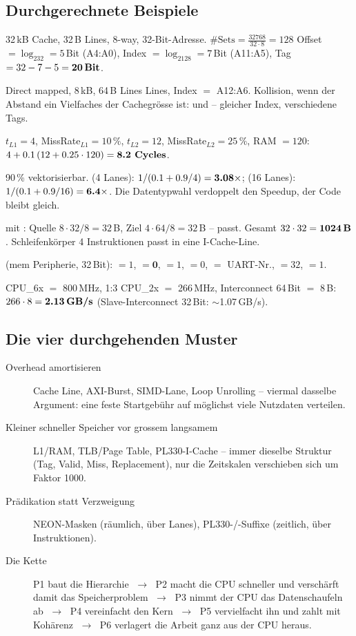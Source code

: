 \subsection{Durchgerechnete Beispiele}
\begin{bsp}
 32\,kB Cache, 32\,B Lines, 8-way, 32-Bit-Adresse.
$\#\text{Sets}=\frac{32768}{32\cdot8}=128$ \ra Offset $=\log_232=5$\,Bit
(A4:A0), Index $=\log_2128=7$\,Bit (A11:A5), Tag $=32-7-5=\textbf{20\,Bit}$.

 Direct mapped, 8\,kB, 64\,B Lines
 Lines, Index $=$ A12:A6. Kollision, wenn der Abstand ein
Vielfaches der Cachegrösse ist:  und  -- gleicher
Index, verschiedene Tags.

 $t_{L1}=4$, MissRate$_{L1}=10\,\%$, $t_{L2}=12$,
MissRate$_{L2}=25\,\%$, RAM $=120$:
$4+0.1\,(12+0.25\cdot120)=\textbf{8.2 Cycles}$.

 90\,\% vektorisierbar.
 (4 Lanes): $1/(0.1+0.9/4)=\textbf{3.08}\times$;
 (16 Lanes): $1/(0.1+0.9/16)=\textbf{6.4}\times$.
\ra Die Datentypwahl verdoppelt den Speedup, der Code bleibt gleich.

  mit : Quelle
$8\cdot32/8=32$\,B, Ziel $4\cdot64/8=32$\,B -- passt. Gesamt
$32\cdot32=\textbf{1024\,B}$. Schleifenkörper 4 Instruktionen \ra passt in
eine I-Cache-Line.

 (mem\,\ra\,Peripherie, 32\,Bit):
$=1$, $=\mathbf{0}$, $=1$,
$=0$, $=$ UART-Nr., $=32$, $=1$.

 CPU\_6x $=$ 800\,MHz, 1:3 \ra CPU\_2x $=$
266\,MHz, Interconnect 64\,Bit $=$ 8\,B: $266\cdot8=\textbf{2.13\,GB/s}$
(Slave-Interconnect 32\,Bit: $\sim$1.07\,GB/s).
\end{bsp}

\subsection{Die vier durchgehenden Muster}
\begin{description}
\item[Overhead amortisieren] Cache Line, AXI-Burst, SIMD-Lane, Loop
  Unrolling -- viermal dasselbe Argument: eine feste Startgebühr auf
  möglichst viele Nutzdaten verteilen.
\item[Kleiner schneller Speicher vor grossem langsamem] L1/RAM,
  TLB/Page Table, PL330-I-Cache -- immer dieselbe Struktur (Tag, Valid,
  Miss, Replacement), nur die Zeitskalen verschieben sich um Faktor 1000.
\item[Prädikation statt Verzweigung] NEON-Masken (räumlich, über Lanes),
  PL330-/-Suffixe (zeitlich, über Instruktionen).
\item[Die Kette] P1 baut die Hierarchie $\;\to\;$ P2 macht die CPU
  schneller und verschärft damit das Speicherproblem $\;\to\;$ P3 nimmt
  der CPU das Datenschaufeln ab $\;\to\;$ P4 vereinfacht den Kern
  $\;\to\;$ P5 vervielfacht ihn und zahlt mit Kohärenz $\;\to\;$ P6
  verlagert die Arbeit ganz aus der CPU heraus.
\end{description}
